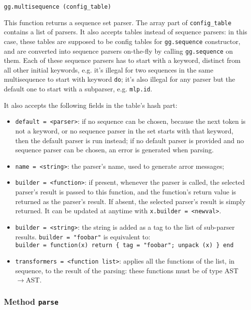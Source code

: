 \begin{verbatim}
gg.multisequence (config_table)
\end{verbatim}

This function returns a sequence set parser. The array part of
\verb|config_table| contains a list of parsers. It also accepts tables
instead of sequence parsers: in this case, these tables are supposed
to be config tables for \verb|gg.sequence| constructor, and are
converted into sequence parsers on-the-fly by calling
\verb|gg.sequence| on them. Each of these sequence parsers has to
start with a keyword, distinct from all other initial keywords,
e.g. it's illegal for two sequences in the same multisequence to start
with keyword {\tt do}; it's also illegal for any parser but the
default one to start with a subparser, e.g. {\tt mlp.id}.

It also accepts the following fields in the table's hash part:
\begin{itemize}
\item\verb|default = <parser>|: if no sequence can be chosen, because
  the next token is not a keyword, or no sequence parser in the set
  starts with that keyword, then the default parser is run instead; if
  no default parser is provided and no sequence parser can be chosen,
  an error is generated when parsing.
\item\verb|name = <string>|: the parser's name, used to generate arror
  messages;
\item\verb|builder = <function>|: if present, whenever the parser is
  called, the selected parser's result is passed to this
  function, and the function's return value is returned as the
  parser's result. If absent, the selected parser's result is simply
  returned. It can be updated at anytime with
  \verb|x.builder = <newval>|.
\item\verb|builder = <string>|: the string is added as a tag to the
  list of sub-parser results. \verb|builder = "foobar"| is equivalent
  to:\\
 \verb|builder = function(x) return { tag = "foobar"; unpack (x) } end|
\item\verb|transformers = <function list>|: applies all the functions
  of the list, in sequence, to the result of the parsing: these
  functions must be of type AST$\rightarrow$AST.
\end{itemize}

\subsubsection{Method {\tt parse}}

